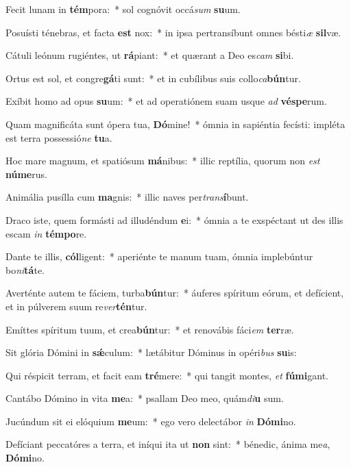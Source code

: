 \item Fecit lunam in \textbf{tém}pora:~* sol cognóvit occá\textit{sum} \textbf{su}um.
\item Posuísti ténebras, et facta \textbf{est} nox:~* in ipsa pertransíbunt omnes bésti\textit{æ} \textbf{sil}væ.
\item Cátuli leónum rugiéntes, ut \textbf{rá}piant:~* et quærant a Deo es\textit{cam} \textbf{si}bi.
\item Ortus est sol, et congre\textbf{gá}ti sunt:~* et in cubílibus suis collo\textit{ca}\textbf{bún}tur.
\item Exíbit homo ad opus \textbf{su}um:~* et ad operatiónem suam usque \textit{ad} \textbf{vés}\textbf{pe}rum.
\item Quam magnificáta sunt ópera tua, \textbf{Dó}mine!~* ómnia in sapiéntia fecísti: impléta est terra possessió\textit{ne} \textbf{tu}a.
\item Hoc mare magnum, et spatiósum \textbf{má}nibus:~* illic reptília, quorum non \textit{est} \textbf{nú}\textbf{me}rus.
\item Animália pusílla cum \textbf{ma}gnis:~* illic naves per\textit{trans}\textbf{í}bunt.
\item Draco iste, quem formásti ad illudéndum \textbf{e}i:~* ómnia a te exspéctant ut des illis escam \textit{in} \textbf{tém}\textbf{po}re.
\item Dante te illis, \textbf{cól}ligent:~* aperiénte te manum tuam, ómnia implebúntur bo\textit{ni}\textbf{tá}te.
\item Averténte autem te fáciem, turba\textbf{bún}tur:~* áuferes spíritum eórum, et defícient, et in púlverem suum re\textit{ver}\textbf{tén}tur.
\item Emíttes spíritum tuum, et crea\textbf{bún}tur:~* et renovábis fáci\textit{em} \textbf{ter}ræ.
\item Sit glória Dómini in \textbf{sǽ}culum:~* lætábitur Dóminus in opéri\textit{bus} \textbf{su}is:
\item Qui réspicit terram, et facit eam \textbf{tré}mere:~* qui tangit montes, \textit{et} \textbf{fú}\textbf{mi}gant.
\item Cantábo Dómino in vita \textbf{me}a:~* psallam Deo meo, quám\textit{di}\textbf{u} sum.
\item Jucúndum sit ei elóquium \textbf{me}um:~* ego vero delectábor \textit{in} \textbf{Dó}\textbf{mi}no.
\item Defíciant peccatóres a terra, et iníqui ita ut \textbf{non} sint:~* bénedic, ánima me\textit{a}, \textbf{Dó}\textbf{mi}no.
